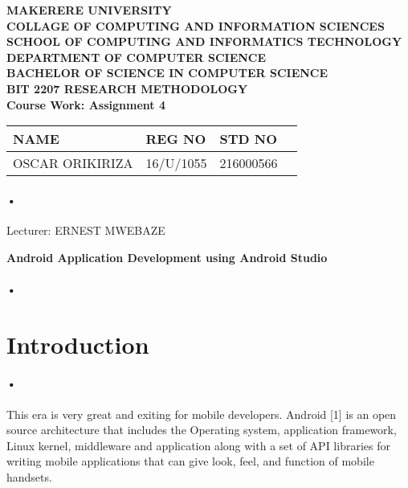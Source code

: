 \documentclass[12pt]{article}
\begin{document}
\begin{Huge}
\begin{center}
\begin{normalsize}
\textbf{MAKERERE UNIVERSITY }\\


\textbf{COLLAGE OF COMPUTING AND INFORMATION SCIENCES} \\
\textbf{SCHOOL OF COMPUTING AND INFORMATICS TECHNOLOGY} \\
\textbf{DEPARTMENT OF COMPUTER SCIENCE} \\
\textbf{BACHELOR OF SCIENCE IN COMPUTER SCIENCE} \\
\textbf{BIT 2207 RESEARCH METHODOLOGY} \\
\textbf{Course Work: Assignment 4}\\
\end{normalsize}
\end{center}
\end{Huge}

\begin{center}
\begin{tabular}{|l|l|l|c|}
\hline NAME  & REG NO & STD NO \\\hline
OSCAR ORIKIRIZA & 16/U/1055 & 216000566 \\\hline
\end{tabular}\paragraph{•}
Lecturer: ERNEST MWEBAZE \\
\end{center}

\newpage

\begin{center}
\textbf{Android Application Development using Android Studio}\\

\paragraph{•}


\end{center}



\section{Introduction}
\paragraph{•}
This era is very great and exiting for mobile developers. Android [1] is an open source architecture that includes the Operating system, application framework, Linux kernel, middleware and application along with a set of API libraries for writing mobile applications that can give look, feel, and function of mobile handsets.
\end{document}
